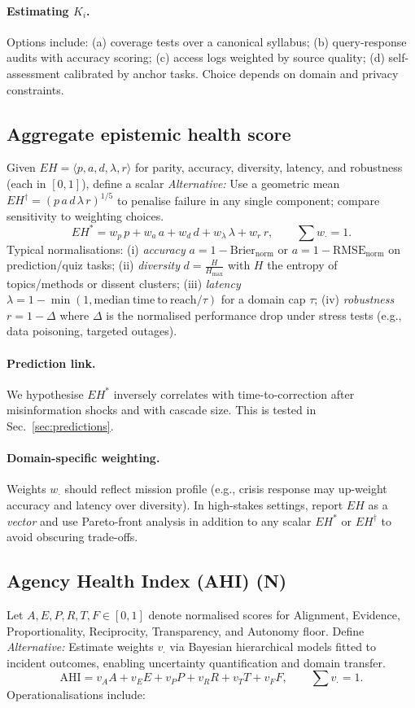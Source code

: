 \documentclass[12pt]{article}
\begin{document}
\paragraph{Estimating $K_i$.} Options include: (a) coverage tests over a canonical syllabus; (b) query-response audits with accuracy scoring; (c) access logs weighted by source quality; (d) self-assessment calibrated by anchor tasks. Choice depends on domain and privacy constraints. \subsection{Aggregate epistemic health score} Given $EH=\langle p,a,d,\lambda,r\rangle$ for parity, accuracy, diversity, latency, and robustness (each in $[0,1]$), define a scalar \emph{Alternative:} Use a geometric mean $EH^{\dagger}=(p\,a\,d\,\lambda\,r)^{1/5}$ to penalise failure in any single component; compare sensitivity to weighting choices. \begin{equation} EH^{\ast}=w_p\,p+w_a\,a+w_d\,d+w_\lambda\,\lambda+w_r\,r,\qquad \sum w_{\cdot}=1. \end{equation} Typical normalisations: (i) \emph{accuracy} $a=1-\mathrm{Brier}_{\mathrm{norm}}$ or $a=1-\mathrm{RMSE}_{\mathrm{norm}}$ on prediction/quiz tasks; (ii) \emph{diversity} $d=\frac{H}{H_{\max}}$ with $H$ the entropy of topics/methods or dissent clusters; (iii) \emph{latency} $\lambda=1-\min(1,\mathrm{median\ time\ to\ reach}/\tau)$ for a domain cap $\tau$; (iv) \emph{robustness} $r=1-\Delta$ where $\Delta$ is the normalised performance drop under stress tests (e.g., data poisoning, targeted outages). \paragraph{Prediction link.} We hypothesise $EH^{\ast}$ inversely correlates with time-to-correction after misinformation shocks and with cascade size. This is tested in Sec.~\ref{sec:predictions}. \paragraph{Domain-specific weighting.} Weights $w_{\cdot}$ should reflect mission profile (e.g., crisis response may up-weight accuracy and latency over diversity). In high-stakes settings, report $EH$ as a \emph{vector} and use Pareto-front analysis in addition to any scalar $EH^{\ast}$ or $EH^{\dagger}$ to avoid obscuring trade-offs. \subsection{Agency Health Index (AHI) (N)} Let $A,E,P,R,T,F\in[0,1]$ denote normalised scores for Alignment, Evidence, Proportionality, Reciprocity, Transparency, and Autonomy floor. Define \emph{Alternative:} Estimate weights $v_{\cdot}$ via Bayesian hierarchical models fitted to incident outcomes, enabling uncertainty quantification and domain transfer. \begin{equation} \mathrm{AHI}=v_A A+v_E E+v_P P+v_R R+v_T T+v_F F,\qquad \sum v_{\cdot}=1. \end{equation} Operationalisations include: 
\end{document}
